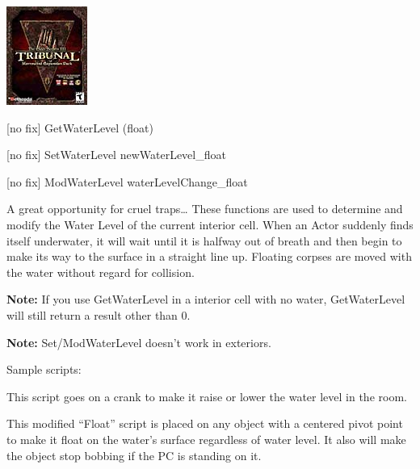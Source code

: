 \includegraphics{media/image6.png}

{[}no fix{]} GetWaterLevel (float)

{[}no fix{]} SetWaterLevel newWaterLevel\_float

{[}no fix{]} ModWaterLevel waterLevelChange\_float

A great opportunity for cruel traps\ldots{} These functions are used to
determine and modify the Water Level of the current interior cell. When
an Actor suddenly finds itself underwater, it will wait until it is
halfway out of breath and then begin to make its way to the surface in a
straight line up. Floating corpses are moved with the water without
regard for collision.

\textbf{Note:} If you use GetWaterLevel in a interior cell with no
water, GetWaterLevel will still return a result other than 0.

\textbf{Note:} Set/ModWaterLevel doesn't work in exteriors.

Sample scripts:

This script goes on a crank to make it raise or lower the water level in
the room.



This modified ``Float'' script is placed on any object with a centered
pivot point to make it float on the water's surface regardless of water
level. It also will make the object stop bobbing if the PC is standing
on it.


